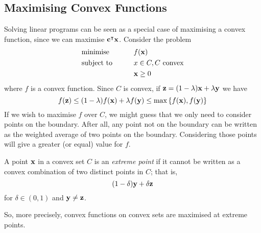 \subsection{Maximising Convex Functions}
Solving linear programs can be seen as a special case of maximising a convex function, since we can maximise \( \vb c^\intercal \vb x \).
Consider the problem
\begin{alignat*}{2}
	 & \text{minimise}   & \qquad & f(\vb x)                  \\
	 & \text{subject to} &        & x \in C, C \text{ convex} \\
	 &                   &        & \vb x \geq 0
\end{alignat*}
where \( f \) is a convex function.
Since \( C \) is convex, if \( \vb z = (1 - \lambda) \vb x + \lambda\vb y \) we have
\[
	f(\vb z) \leq (1 - \lambda) f(\vb x) + \lambda f(\vb y) \leq \max\qty{f(\vb x), f(\vb y)}
\]
If we wish to maximise \( f \) over \( C \), we might guess that we only need to consider points on the boundary.
After all, any point not on the boundary can be written as the weighted average of two points on the boundary.
Considering those points will give a greater (or equal) value for \( f \).
\begin{definition}
	A point \( \vb x \) in a convex set \( C \) is an \textit{extreme point} if it cannot be written as a convex combination of two distinct points in \( C \); that is,
	\[
		(1 - \delta) \vb y + \delta \vb z
	\]
	for \( \delta \in (0, 1) \) and \( \vb y \neq \vb z \).
\end{definition}
So, more precisely, convex functions on convex sets are maximised at extreme points.

